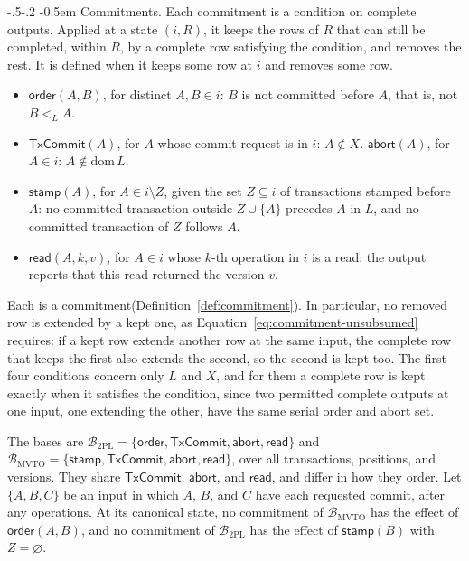 \documentclass[sigconf]{cidr-2027}
\makeatletter
\theoremstyle{remark}
\renewcommand\paragraph{\@startsection{paragraph}{4}{\z@}%
  {-.5\baselineskip \@plus -2\p@ \@minus -.2\p@}%
  {-0.5em}%
  {\normalfont\bfseries}}
\newcommand{\commitment}{commitment\xspace}
\newcommand{\Commitments}{Commitments\xspace}
\newcommand{\outrel}{extends\xspace}          %
\newcommand{\outrelpart}{extending\xspace}    %
\newcommand{\outrelpast}{extended\xspace}     %
\makeatother
\begin{document}
\paragraph{\Commitments.}
Each \commitment is a condition on complete outputs. Applied at a state
$(i,R)$, it keeps the rows of $R$ that can still be completed, within $R$, by a
complete row satisfying the condition, and removes the rest. It is defined
when it keeps some row at $i$ and removes some row.
\begin{itemize}
\item
$\mathsf{order}(A,B)$, for distinct $A,B\in i$: $B$ is not committed
        before $A$, that is, not $B<_L A$.
\item
$\mathsf{TxCommit}(A)$, for $A$ whose commit request is in $i$:
        $A\notin X$.\quad
        $\mathsf{abort}(A)$, for $A\in i$: $A\notin\mathrm{dom}\,L$.
\item
$\mathsf{stamp}(A)$, for $A\in i\setminus Z$, given the set $Z\subseteq
        i$ of transactions stamped before $A$: no committed transaction outside
        $Z\cup\{A\}$ precedes $A$ in $L$, and no committed transaction of $Z$
        follows $A$.
\item
$\mathsf{read}(A,k,v)$, for $A\in i$ whose $k$-th operation in $i$ is a
        read: the output reports that this read returned the version $v$.
\end{itemize}
Each is a \commitment (Definition~\ref{def:commitment}). In particular, no
removed row is \outrelpast by a kept one, as
Equation~\ref{eq:commitment-unsubsumed} requires: if a kept row \outrel another
row at the same input, the complete row that keeps the first also \outrel the
second, so the second is kept too. The first four conditions concern only $L$
and $X$, and for them a complete row is kept exactly when it satisfies the
condition, since two permitted complete outputs at one input, one
\outrelpart the other, have the same serial order and abort set.

The bases are
$\mathcal B_{\mathrm{2PL}}=\{\mathsf{order},\mathsf{TxCommit},\mathsf{abort},\mathsf{read}\}$
and
$\mathcal B_{\mathrm{MVTO}}=\{\mathsf{stamp},\mathsf{TxCommit},\mathsf{abort},\mathsf{read}\}$,
over all transactions, positions, and versions. They share
$\mathsf{TxCommit}$, $\mathsf{abort}$, and $\mathsf{read}$, and differ in how
they order. Let $\{A,B,C\}$ be an input in which $A$, $B$, and $C$ have each
requested commit, after any operations. At its canonical state, no \commitment
of $\mathcal B_{\mathrm{MVTO}}$ has the effect of $\mathsf{order}(A,B)$, and no
\commitment of $\mathcal B_{\mathrm{2PL}}$ has the effect of $\mathsf{stamp}(B)$
with $Z=\varnothing$.
\end{document}
